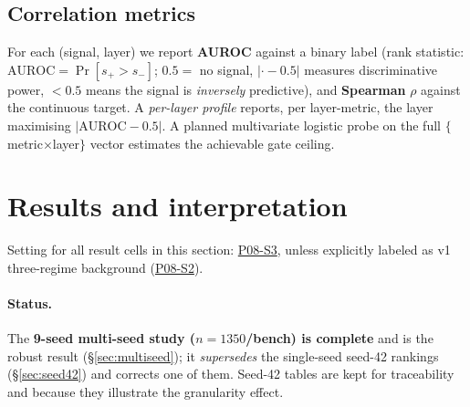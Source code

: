 \documentclass[11pt]{article}
\begin{document}
\subsection{Correlation metrics}
\label{sec:corr}
For each (signal, layer) we report \textbf{AUROC} against a binary label
(rank statistic: $\mathrm{AUROC}=\Pr[s_{+}>s_{-}]$; $0.5=$ no signal,
$|{\cdot}-0.5|$ measures discriminative power, $<0.5$ means the signal is
\emph{inversely} predictive), and \textbf{Spearman} $\rho$ against the
continuous target. A \emph{per-layer profile} reports, per layer-metric,
the layer maximising $|\mathrm{AUROC}-0.5|$. A planned multivariate
logistic probe on the full $\{$metric$\times$layer$\}$ vector estimates
the achievable gate ceiling.

\section{Results and interpretation}
\label{sec:results}

Setting for all result cells in this section:
\href{https://github.com/BDeMo/research-notes/blob/main/notes/plans/08-model-outputs-delta-w/settings/settings.md#p08-s3--v15-intrinsic-signal-probe}{P08-S3},
unless explicitly labeled as v1 three-regime background
(\href{https://github.com/BDeMo/research-notes/blob/main/notes/plans/08-model-outputs-delta-w/settings/settings.md#p08-s2--v1-phase-y-three-regime-benchmark-cells}{P08-S2}).

\paragraph{Status.} The \textbf{9-seed multi-seed study
($n{=}1350$/bench) is complete} and is the robust result
(\S\ref{sec:multiseed}); it \emph{supersedes} the single-seed seed-42
rankings (\S\ref{sec:seed42}) and corrects one of them. Seed-42 tables
are kept for traceability and because they illustrate the granularity
effect.
\end{document}
